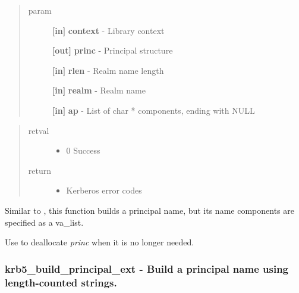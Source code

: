 \documentclass[letterpaper,10pt,english]{sphinxmanual}
\begin{document}
\begin{quote}\begin{description}
\item[{param}] \leavevmode
\textbf{{[}in{]}} \textbf{context} - Library context

\textbf{{[}out{]}} \textbf{princ} - Principal structure

\textbf{{[}in{]}} \textbf{rlen} - Realm name length

\textbf{{[}in{]}} \textbf{realm} - Realm name

\textbf{{[}in{]}} \textbf{ap} - List of char * components, ending with NULL

\end{description}\end{quote}
\begin{quote}\begin{description}
\item[{retval}] \leavevmode\begin{itemize}
\item {} 
0   Success

\end{itemize}

\item[{return}] \leavevmode\begin{itemize}
\item {} 
Kerberos error codes

\end{itemize}

\end{description}\end{quote}

Similar to {\hyperref[appdev/refs/api/krb5_build_principal:c.krb5_build_principal]{}} , this function builds a principal name, but its name components are specified as a va\_list.

Use {\hyperref[appdev/refs/api/krb5_free_principal:c.krb5_free_principal]{}} to deallocate \emph{princ} when it is no longer needed.


\subsubsection{krb5\_build\_principal\_ext -  Build a principal name using length-counted strings.}
\label{appdev/refs/api/krb5_build_principal_ext:krb5-build-principal-ext-build-a-principal-name-using-length-counted-strings}\label{appdev/refs/api/krb5_build_principal_ext::doc}
\end{document}
